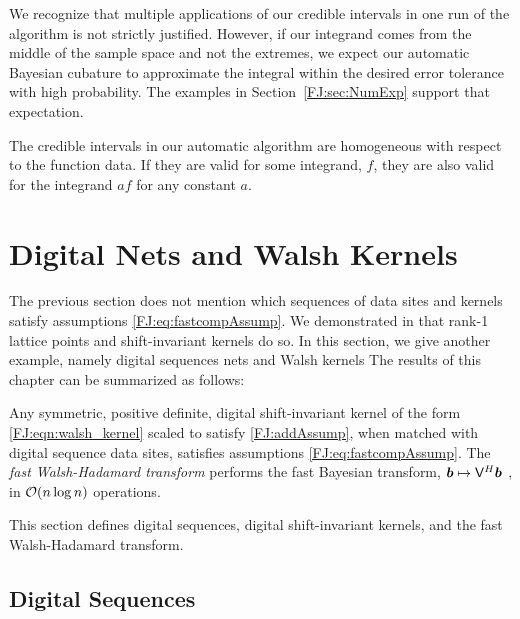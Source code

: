 \documentclass[graybox,footinfo]{svmult}
\begin{document}
We recognize that multiple applications of our credible intervals in one run of the algorithm is not strictly justified.  However, if our integrand comes from the middle of the sample space  and not the extremes, we expect our automatic Bayesian cubature to approximate the integral within the desired error tolerance with high probability. The examples in Section~\ref{FJ:sec:NumExp} support that expectation. 

The credible intervals in our automatic algorithm are homogeneous with respect to the function data.  If they are valid for some integrand, $f$, they are also valid for the integrand $a f$ for any constant $a$.  




\section{Digital Nets and Walsh Kernels}
\label{FJ:sec:sobol_walsh}


The previous section does not mention which sequences of data sites and  kernels satisfy assumptions \eqref{FJ:eq:fastcompAssump}.  We demonstrated in \cite{RatHic19a} that rank-1 lattice points and shift-invariant kernels do so.  In this section, we give another example, namely 
digital sequences nets and Walsh kernels
The results of this chapter can be summarized as follows:



\begin{theorem} \label{FJ:thm:main}
	Any symmetric, positive definite, digital shift-invariant kernel of the form \eqref{FJ:eqn:walsh_kernel} scaled to satisfy \eqref{FJ:addAssump}, when matched with digital sequence data sites, satisfies assumptions \eqref{FJ:eq:fastcompAssump}.  The \emph{fast Walsh-Hadamard transform} performs the fast Bayesian transform,  ${\boldsymbol{b}} \mapsto \mathsf{V}^H {\boldsymbol{b}}$ , in ${\mathcal{O}}(n \log n)$ operations.
\end{theorem}
This section defines digital sequences, digital shift-invariant kernels, and the fast Walsh-Hadamard transform.

\subsection{Digital Sequences} \label{FJ:sec:sobol}
\end{document}
